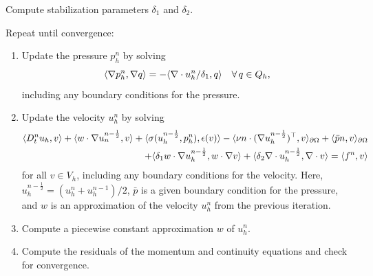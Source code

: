 {
  \item
    Compute stabilization parameters $\delta_1$ and $\delta_2$.

  \item
    Repeat until convergence:

    \begin{enumerate}
    \item
      Update the pressure $p^n_h$ by solving
      \begin{equation}\label{eq:g2_scheme,1}
        \renni{\nabla q}{\nabla p_h^n} = - \renni{q}{\nabla \cdot u_h^n/\delta_1}
        \quad \foralls q \in Q_h,
      \end{equation}
      including any boundary conditions for the pressure.

    \item
      Update the velocity $u^n_h$ by solving
      \begin{equation}\label{eq:g2_scheme,2}
        \begin{split}
          \renni{v}{D_t^n u_h}
          + \renni{v}{w \cdot \nabla u_n^{n-\frac{1}{2}}}
          + \renni{\epsilon(v)}{\sigma(u_h^{n-\frac{1}{2}}, p_h^n)}
          - \renni{v}{\nu n \cdot (\nabla u_h^{n-\frac{1}{2}})^{\top}}_{\partial\Omega}
          + \renni{v}{\bar{p} n}_{\partial\Omega} \\
          + \renni{w \cdot \nabla v}{\delta_1 w \cdot \nabla u_h^{n-\frac{1}{2}}}
          + \renni{\nabla \cdot v}{\delta_2 \nabla \cdot u_h^{n-\frac{1}{2}}}
          = \renni{v}{f^n}
        \end{split}
      \end{equation}
      for all $v \in V_h$, including any boundary conditions for the
      velocity. Here, $u_h^{n-\frac{1}{2}} = (u_h^n + u_h^{n-1}) / 2$,
      $\bar{p}$ is a given boundary condition for the pressure, and
      $w$ is an approximation of the velocity $u^n_h$ from the
      previous iteration.

    \item
      Compute a piecewise constant approximation $w$ of $u^n_h$.

    \item
      Compute the residuals of the momentum and continuity equations
      and check for convergence.

    \end{enumerate}
}

